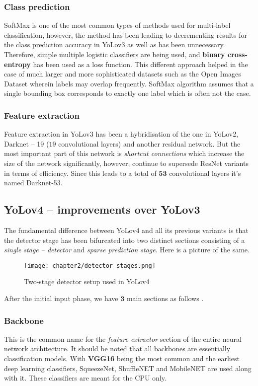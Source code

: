 \subsubsection{Class prediction}
SoftMax is one of the most common types of methods used for multi-label classification, however, the method has been leading to decrementing results for the class prediction accuracy in YoLov3 as well as has been unnecessary. Therefore, simple multiple logistic classifiers are being used, and \textbf{binary cross-entropy} has been used as a loss function. This different approach helped in the case of much larger and more sophisticated datasets such as the Open Images Dataset wherein labels may overlap frequently. SoftMax algorithm assumes that a single bounding box corresponds to exactly one label which is often not the case.

\subsubsection{Feature extraction}
Feature extraction in YoLov3 has been a hybridisation of the one in YoLov2, Darknet – 19 ($19$ convolutional layers) and another residual network. But the most important part of this network is \textit{shortcut connections} which increase the size of the network significantly, however, continue to supersede ResNet variants in terms of efficiency. Since this leads to a total of $\boldsymbol{53}$ convolutional layers it's named Darknet-53.


\subsection{YoLov4 – improvements over YoLov3 \cite{bochkovskiy2020yolov4}}

The fundamental difference between YoLov4 and all its previous variants is that the detector stage has been bifurcated into two distinct sections consisting of a \textit{single stage – detector} and \textit{sparse prediction stage}. Here is a picture of the same.

\begin{figure}[h]
  \centering
  \texttt{[image: chapter2/detector\_stages.png]}
  \caption{Two-stage detector setup used in YoLov4}
  \label{fig:detector}
\end{figure}

After the initial input phase, we have $\boldsymbol{3}$ main sections as follows \cite{Rajput2021}.

\subsubsection{Backbone}
This is the common name for the \textit{feature extractor} section of the entire neural network architecture. It should be noted that all backbones are essentially classification models. With \textbf{VGG16} being the most common and the earliest deep learning classifiers, SqueezeNet, ShuffleNET and MobileNET are used along with it. These classifiers are meant for the CPU only.

